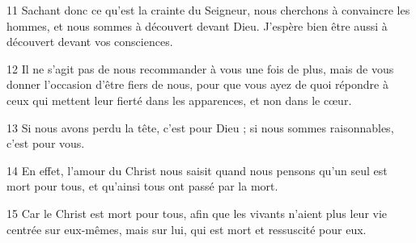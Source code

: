 
11 Sachant donc ce qu’est la crainte du Seigneur, nous cherchons à convaincre les hommes, et nous sommes à découvert devant Dieu. J’espère bien être aussi à découvert devant vos consciences.

12 Il ne s’agit pas de nous recommander à vous une fois de plus, mais de vous donner l’occasion d’être fiers de nous, pour que vous ayez de quoi répondre à ceux qui mettent leur fierté dans les apparences, et non dans le cœur.

13 Si nous avons perdu la tête, c’est pour Dieu ; si nous sommes raisonnables, c’est pour vous.

14 En effet, l’amour du Christ nous saisit quand nous pensons qu’un seul est mort pour tous, et qu’ainsi tous ont passé par la mort.

15 Car le Christ est mort pour tous, afin que les vivants n’aient plus leur vie centrée sur eux-mêmes, mais sur lui, qui est mort et ressuscité pour eux.
